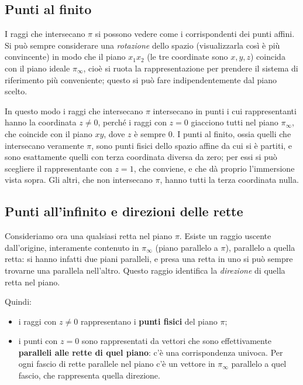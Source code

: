 \subsection{Punti al finito}

I raggi che intersecano $\pi$ si possono vedere come i corrispondenti dei punti affini. Si può sempre considerare una \emph{rotazione} dello spazio (visualizzarla così è più convincente) in modo che il piano $x_1x_2$ (le tre coordinate sono $x,y,z$) coincida con il piano ideale $\pi_\infty$, cioè si ruota la rappresentazione per prendere il sistema di riferimento più conveniente; questo si può fare indipendentemente dal piano scelto.

In questo modo i raggi che intersecano $\pi$ intersecano in punti i cui rappresentanti hanno la coordinata $z\neq 0$, perché i raggi con $z=0$ giacciono tutti nel piano $\pi_\infty$, che coincide con il piano $xy$, dove $z$ è sempre $0$. I punti al finito, ossia quelli che intersecano veramente $\pi$, sono punti fisici dello spazio affine da cui si è partiti, e sono esattamente quelli con terza coordinata diversa da zero; per essi si può scegliere il rappresentante con $z=1$, che conviene, e che dà proprio l'immersione vista sopra. Gli altri, che non intersecano $\pi$, hanno tutti la terza coordinata nulla.

\subsection{Punti all'infinito e direzioni delle rette}

Consideriamo ora una qualsiasi retta nel piano $\pi$. Esiste un raggio uscente dall'origine, interamente contenuto in $\pi_\infty$ (piano parallelo a $\pi$), parallelo a quella retta: si hanno infatti due piani paralleli, e presa una retta in uno si può sempre trovarne una parallela nell'altro. Questo raggio identifica la \emph{direzione} di quella retta nel piano.

Quindi:
\begin{itemize}
  \item i raggi con $z\neq 0$ rappresentano i \textbf{punti fisici} del piano $\pi$;
  \item i punti con $z=0$ sono rappresentati da vettori che sono effettivamente \textbf{paralleli alle rette di quel piano}: c'è una corrispondenza univoca. Per ogni fascio di rette parallele nel piano c'è un vettore in $\pi_\infty$ parallelo a quel fascio, che rappresenta quella direzione.
\end{itemize}

